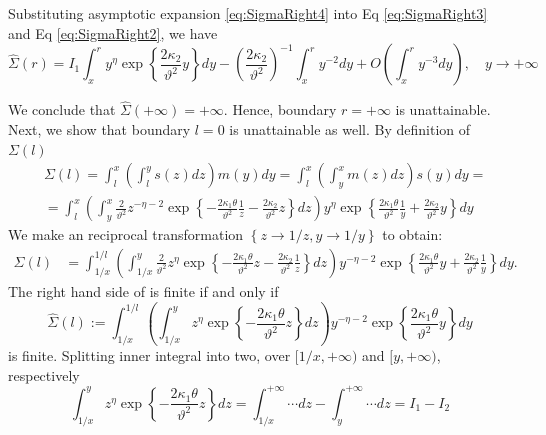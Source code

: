 \documentclass[11pt,a4paper] {article}
\begin{document}
Substituting asymptotic expansion \eqref{eq:SigmaRight4} into Eq \eqref{eq:SigmaRight3} and Eq \eqref{eq:SigmaRight2}, we have
\begin{equation*}%
\widehat\Sigma(r)=I_1
\int_x^ry^\eta\exp\left\{\frac{2\kappa_2}{\vartheta^2}y\right\}dy-
\left(\frac{2\kappa_2}{\vartheta^2}\right)^{-1}\int_x^ry^{-2}dy+O\left(\int_x^ry^{-3}dy\right),\quad y\to +\infty
\end{equation*}

We conclude that $\widehat\Sigma(+\infty)=+\infty$. Hence, boundary $r=+\infty$ is unattainable. 
Next, we show that boundary $l=0$ is unattainable as well. By definition of $\Sigma(l)$
\begin{equation*}%
\begin{split}
&\Sigma(l)=\int_l^x\left(\int_l^y s(z)dz\right)m(y)dy=
\int_l^x\left(\int_y^x m(z)dz\right)s(y)dy=\\
&=\int_l^x\left(\int_y^x \frac{2}{\vartheta^2}z^{-\eta-2}\exp\left\{-\frac{2\kappa_1\theta}{\vartheta^2}\frac{1}{z}-\frac{2\kappa_2}{\vartheta^2}z\right\}dz\right)y^\eta\exp\left\{\frac{2\kappa_1\theta}{\vartheta^2}\frac{1}{y}+\frac{2\kappa_2}{\vartheta^2}y\right\}dy
\end{split}
\end{equation*}
We make an reciprocal transformation $\left\{z\to 1/z, y\to 1/y\right\}$ to obtain:
\begin{equation*}%
\begin{split}
\Sigma(l)&=\int_{1/x}^{1/l}\left(\int_{1/x}^y \frac{2}{\vartheta^2}z^{\eta}\exp\left\{-\frac{2\kappa_1\theta}{\vartheta^2}z-\frac{2\kappa_2}{\vartheta^2}\frac{1}{z}\right\}dz\right)y^{-\eta-2}\exp\left\{\frac{2\kappa_1\theta}{\vartheta^2}y+\frac{2\kappa_2}{\vartheta^2}\frac{1}{y}\right\}dy.
\end{split}
\end{equation*}
The right hand side of is finite if and only if
\begin{equation}\label{eq:SigmaLeft2}
\widehat\Sigma(l):=\int_{1/x}^{1/l}\left(\int_{1/x}^y z^{\eta}\exp\left\{-\frac{2\kappa_1\theta}{\vartheta^2}z\right\}dz\right)y^{-\eta-2}\exp\left\{\frac{2\kappa_1\theta}{\vartheta^2}y\right\}dy
\end{equation}
is finite. Splitting inner integral into two, over $[1/x,+\infty)$ and $[y,+\infty)$, respectively
\begin{equation}\label{eq:SigmaLeft3}
\int_{1/x}^{y}z^{\eta}\exp\left\{-\frac{2\kappa_1\theta}{\vartheta^2}z\right\}dz=
\int_{1/x}^{+\infty} \cdots dz-\int_{y}^{+\infty} \cdots dz=I_1-I_2
\end{equation}
\end{document}
